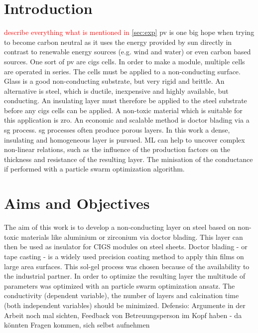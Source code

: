 \documentclass[a4paper]{article}
\newcommand{\td}[1]{\textcolor{red}{#1}}
\begin{document}
\section{Introduction}
\td{describe everything what is mentioned in \ref{sec:exp}}
\Gls{pv} is one big hope when trying to become carbon neutral as it uses the energy provided by sun directly in contrast to renewable energy sources (e.g. wind and water) or even carbon based sources.
One sort of \gls{pv} are \gls{cigs} \cite{Vasekar2010} cells. %
In order to make a module, multiple cells are operated in series. 
The cells must be applied to a non-conducting surface.
Glass is a good non-conducting substrate, but very rigid and brittle. 
An alternative is steel, which is ductile, inexpensive and highly available, but conducting. 
An insulating layer must therefore be applied to the steel substrate before any \gls{cigs} cells can be applied.
A non-toxic material which is suitable for this application is \gls{zro}. 
An economic and scalable method is doctor blading via a \gls{sg} process. 
\gls{sg} processes often produce porous layers. 
In this work a dense, insulating and homogeneous layer is pursued. 
ML can help to uncover complex non-linear relations, such as the influence of the production factors on the thickness and resistance of the resulting layer.
The minisation of the conductance if performed with a particle swarm optimization algorithm.
\section{Aims and Objectives}
The aim of this work is to develop a non-conducting layer on steel based on  non-toxic materials like aluminium or zirconium via doctor blading. 
This layer can then be used as insulator for CIGS modules on steel sheets.
Doctor blading - or tape casting - is a widely used precision coating method to apply thin films on large area surfaces\cite{Berni2004}.
This sol-gel process was chosen because of the availability to the industrial partner.
In order to optimize the resulting layer the multitude of parameters was optimized with an particle swarm optimization ansatz. %
The conductivity (dependent variable), the number of layers and calcination time (both independent variables) should be minimized.
\iffalse
Defensio: Argumente in der Arbeit noch mal sichten, Feedback von Betreuungsperson im Kopf haben - da könnten Fragen kommen, 
sich selbst aufnehmen 
\end{document}
